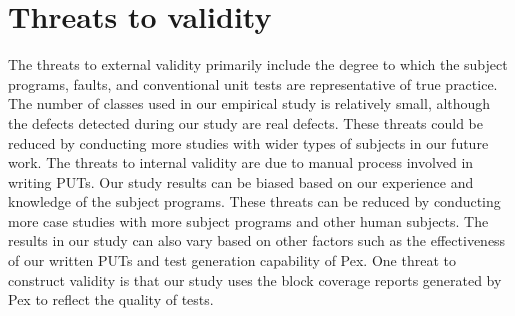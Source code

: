 \section{Threats to validity}
\label{sec:tov}
\vspace*{2ex}
The threats to external validity primarily include the degree to which the subject programs, faults, and conventional unit tests are representative of true practice. The number of classes used in our empirical study is relatively small, although the defects detected during our study are real defects. These threats could be reduced by conducting more studies with wider types of subjects in our future work. The threats to internal validity are due to manual process involved in writing PUTs. Our study results can be biased based on our experience and knowledge of the subject programs. These threats can be reduced by conducting more case studies with more subject programs and other human subjects. The results in our study can also vary based on other factors such as the effectiveness of our written PUTs and test generation capability of Pex. One threat to construct validity is that our study uses the block coverage reports generated by Pex to reflect the quality of tests.